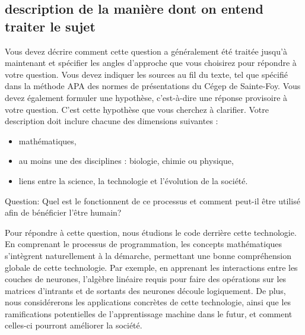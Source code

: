 \subsection{description de la manière dont on entend traiter le sujet}
Vous devez décrire comment cette question a généralement été traitée jusqu’à
maintenant et spécifier les angles d’approche que vous choisirez pour répondre
à votre question. Vous devez indiquer les sources au
fil du texte, tel que spécifié dans la méthode APA des normes de présentations
du Cégep de Sainte-Foy. Vous devez également formuler une hypothèse, c’est-à-dire
une réponse provisoire à votre question. C’est
cette hypothèse que vous cherchez à clarifier.
Votre description doit inclure chacune des dimensions suivantes :
\begin{itemize}
  \item mathématiques,
  \item au moins une des disciplines : biologie, chimie ou physique,
  \item liens entre la science, la technologie et l’évolution de la société.
\end{itemize}

Question: Quel est le fonctionnent de ce processus et comment peut-il être utilisé afin de bénéficier l’être humain?

Pour répondre à cette question, nous étudions le code derrière cette technologie. 
En comprenant le processus de programmation, les concepts mathématiques s'intègrent
naturellement à la démarche, permettant une bonne compréhension globale de
cette technologie. Par exemple, en apprenant les interactions entre les couches
de neurones, l'algèbre linéaire requis pour faire des opérations sur les matrices
d'intrants et de sortants des neurones découle logiquement. De plus,
nous considérerons les applications concrètes de cette technologie, ainsi que les
ramifications potentielles de l'apprentissage machine dans le futur, et comment
celles-ci pourront améliorer la société.
